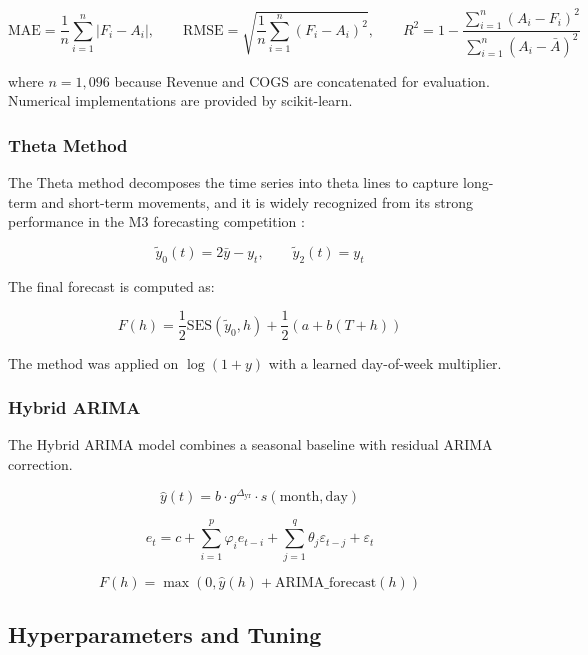 \documentclass[12pt,a4paper]{article}
\begin{document}
\[
\mathrm{MAE} = \frac{1}{n} \sum_{i=1}^{n} |F_i - A_i|,
\qquad
\mathrm{RMSE} = \sqrt{\frac{1}{n} \sum_{i=1}^{n} (F_i - A_i)^2},
\qquad
R^2 = 1 - \frac{\sum_{i=1}^{n}(A_i - F_i)^2}{\sum_{i=1}^{n}(A_i - \bar{A})^2}
\]

where $n = 1,096$ because Revenue and COGS are concatenated for evaluation. Numerical implementations are provided by scikit-learn.

\subsubsection{Theta Method}

The Theta method decomposes the time series into theta lines to capture long-term and short-term movements, and it is widely recognized from its strong performance in the M3 forecasting competition \cite{Assimakopoulos2000}:

\[
\tilde{y}_0(t) = 2\bar{y} - y_t,
\qquad
\tilde{y}_2(t) = y_t
\]

The final forecast is computed as:

\[
F(h) = \frac{1}{2}\mathrm{SES}(\tilde{y}_0, h) + \frac{1}{2}(a + b(T+h))
\]

The method was applied on $\log(1+y)$ with a learned day-of-week multiplier.

\subsubsection{Hybrid ARIMA}

The Hybrid ARIMA model combines a seasonal baseline with residual ARIMA correction.

\[
\hat{y}(t) = b \cdot g^{\Delta_{\mathrm{yr}}} \cdot s(\mathrm{month}, \mathrm{day})
\]

\[
e_t = c + \sum_{i=1}^{p} \varphi_i e_{t-i} + \sum_{j=1}^{q} \theta_j \varepsilon_{t-j} + \varepsilon_t
\]

\[
F(h) = \max(0, \hat{y}(h) + \mathrm{ARIMA\_forecast}(h))
\]

\subsection{Hyperparameters and Tuning}
\label{sec:hyperparameters-tuning}
\end{document}
